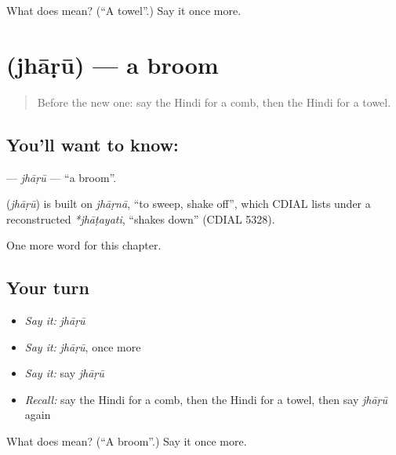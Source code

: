 \begin{tcolorbox}[breakable,colback=teal!4,colframe=teal!35!black,title={Before you move on}]
What does  mean? (\textquotedblleft{}A towel\textquotedblright{}.) Say it once more.
\end{tcolorbox}
\section[\texorpdfstring{\hi{झाड़ू} (jhāṛū)}{झाड़ू (jhāṛū)}]{ (jhāṛū) — a broom}

\label{lesson:HI-C131-jharu}



\begin{quote}
Before the new one: say the Hindi for a comb, then the Hindi for a towel.
\end{quote}

\subsection*{You'll want to know: }
\textbf{} — \emph{jhāṛū} — \textquotedblleft{}a broom\textquotedblright{}.

\begin{cousinweb}
\textbf{} (\emph{jhāṛū}) is built on \emph{jhāṛnā}, \textquotedblleft{}to sweep, shake off\textquotedblright{}, which CDIAL lists under a reconstructed \emph{*jhāṭayati}, \textquotedblleft{}shakes down\textquotedblright{} (CDIAL 5328).
\end{cousinweb}

\begin{grammarlens}[title={What you've built}]
One more word for this chapter.
\end{grammarlens}

\subsection*{Your turn}
\begin{itemize}
\raggedright
  \item \emph{Say it:} \emph{jhāṛū}
  \item \emph{Say it:} \emph{jhāṛū}, once more
  \item \emph{Say it:} say \emph{jhāṛū}
  \item \emph{Recall:} say the Hindi for a comb, then the Hindi for a towel, then say \emph{jhāṛū} again
\end{itemize}

\begin{tcolorbox}[breakable,colback=teal!4,colframe=teal!35!black,title={Before you move on}]
What does  mean? (\textquotedblleft{}A broom\textquotedblright{}.) Say it once more.
\end{tcolorbox}
